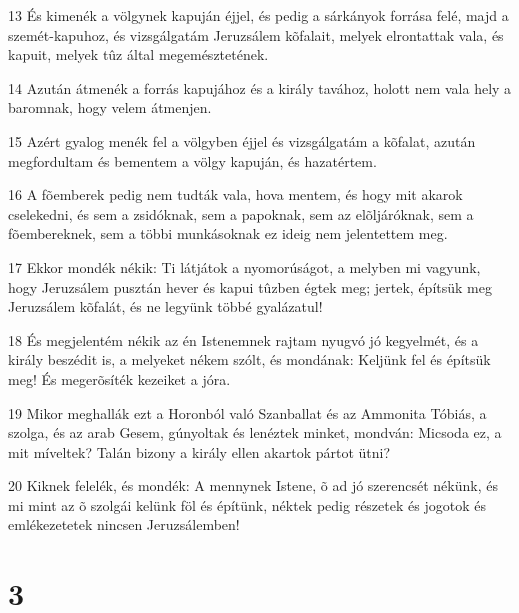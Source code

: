 \par 13 És kimenék a völgynek kapuján éjjel, és pedig a sárkányok forrása felé, majd a szemét-kapuhoz, és vizsgálgatám Jeruzsálem kõfalait, melyek elrontattak vala, és kapuit, melyek tûz által megemésztetének.
\par 14 Azután átmenék a forrás kapujához és a király tavához, holott nem vala hely a baromnak, hogy velem átmenjen.
\par 15 Azért gyalog menék fel a völgyben éjjel és vizsgálgatám a kõfalat, azután megfordultam és bementem a völgy kapuján, és hazatértem.
\par 16 A fõemberek pedig nem tudták vala, hova mentem, és hogy mit akarok cselekedni, és sem a zsidóknak, sem a papoknak, sem az elõljáróknak, sem a fõembereknek, sem a többi munkásoknak ez ideig nem jelentettem meg.
\par 17 Ekkor mondék nékik: Ti látjátok a nyomorúságot, a melyben mi vagyunk, hogy Jeruzsálem pusztán hever és kapui tûzben égtek meg; jertek, építsük meg Jeruzsálem kõfalát, és ne legyünk többé gyalázatul!
\par 18 És megjelentém nékik az én Istenemnek rajtam nyugvó jó kegyelmét, és a király beszédit is, a melyeket nékem szólt, és mondának: Keljünk fel és építsük meg! És megerõsíték kezeiket a jóra.
\par 19 Mikor meghallák ezt a Horonból való Szanballat és az Ammonita Tóbiás, a szolga, és az arab Gesem, gúnyoltak és lenéztek minket, mondván: Micsoda ez, a mit míveltek? Talán bizony a király ellen akartok pártot ütni?
\par 20 Kiknek felelék, és mondék: A mennynek Istene, õ ad jó szerencsét nékünk, és mi mint az õ szolgái kelünk föl és építünk, néktek pedig részetek és jogotok és emlékezetetek nincsen Jeruzsálemben!

\chapter{3}

